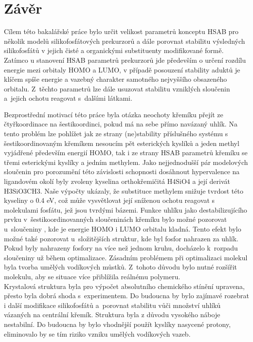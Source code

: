 \documentclass[
  printed, %
  table,   %
  lof,     %
  lot,     %
  oneside,
]{fithesis3}
\begin{document}
  
  \chapter{Závěr}
Cílem této bakalářské práce bylo určit velikost parametrů konceptu HSAB pro několik modelů silikofosfátových prekurzorů a dále porovnat stabilitu výsledných silikofosfátů v jejich čisté a organickými substituenty modifikované formě.
Zatímco u stanovení HSAB parametrů prekurzorů jde především o určení rozdílu energie mezi orbitaly HOMO a LUMO, v případě posouzení stability aduktů je klíčem spíše energie a vazebný charakter samotného nejvyššího obsazeného orbitalu. Z~těchto parametrů lze dále usuzovat stabilitu vzniklých sloučenin a~jejich ochotu reagovat s~dalšími látkami. 

Bezprostřední motivací této práce byla otázka neochoty křemíku přejít ze čtyřkoordinace na šestikoordinci, pokud má na sebe přímo navázaný uhlík. Na tento problém lze  pohlížet jak ze strany (ne)stability příslušného  systému s šestikoordinovaným křemíkem nesoucím pět esterických kyslíků a jeden methyl vyjádřené především energií HOMO, tak i ze strany HSAB parametrů křemíku se třemi esterickými kyslíky a jedním methylem. 
Jako nejjednodušší pár modelových sloučenin pro porozumění této závislosti schopnosti dosáhnout hypervalence na ligandovém okolí byly zvoleny kyselina orthokřemičitá H4SiO4 a její derivát H3SiO3CH3. Naše výpočty ukázaly, že substituce methylem snižuje tvrdost této kyseliny o 0.4 eV, což může vysvětlovat její sníženou ochotu reagovat s molekulami fosfátu, jež jsou tvrdými bázemi. Funkce uhlíku jako destabilizujícího prvku v~šestikoordinovanných sloučeninách křemíku bylo možné pozorovat u~sloučeniny , kde je energie HOMO i LUMO orbitalu kladná. Tento efekt bylo možné také pozorovat u~složitějších struktur, kde byl fosfor nahrazen za uhlík. Pokud byly nahrazeny fosfory na více než jednom kruhu, docházelo k~rozpadu sloučeniny už během optimalizace. Zásadním problémem při optimalizaci molekul byla tvorba umělých vodíkových můstků. Z~tohoto důvodu bylo nutné rozšířit molekulu, aby se situace více přiblížila reálnému polymeru. \\

Krystalová struktura byla pro výpočet absolutního chemického stínění upravena, přesto byla dobrá shoda s~experimentem. Do budoucna by bylo zajímavé rozebrat i další modifikace silikofosfátů a~porovnat stabilitu vůči množství uhlíků vázaných na centrální křemík. Struktura  byla z důvodu vysokého náboje nestabilní. Do budoucna by bylo vhodnější použít kyslíky nasycené protony, eliminovalo by se tím riziko vzniku umělých vodíkových vazeb.
  
\end{document}

